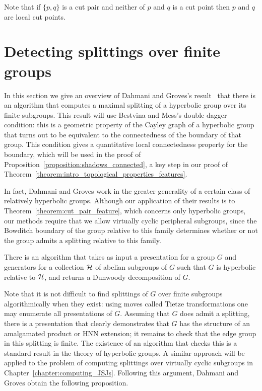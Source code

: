 \begin{remark}
  Note that if $\{p, q\}$ is a cut pair and neither of $p$ and $q$ is a cut point then $p$ and $q$ are local cut points.
\end{remark}

\section{Detecting splittings over finite groups}

In this section we give an overview of Dahmani and Groves's result~\cite{dahmanigroves08a} that there is an algorithm that computes a maximal splitting of a hyperbolic group over its finite subgroups. 
This result will use Bestvina and Mess's double dagger condition: this is a geometric property of the Cayley graph of a hyperbolic group that turns out to be equivalent to the connectedness of the boundary of that group.
This condition gives a quantitative local connectedness property for the boundary, which will be used in the proof of Proposition~\ref{proposition:shadows_connected}, a key step in our proof of Theorem~\ref{theorem:intro_topological_properties_features}.

In fact, Dahmani and Groves work in the greater generality of a certain class of relatively hyperbolic groups.
Although our application of their results is to Theorem~\ref{theorem:cut_pair_feature}, which concerns only hyperbolic groups, our methods require that we allow virtually cyclic peripheral subgroups, since the Bowditch boundary of the group relative to this family determines whether or not the group admits a splitting relative to this family. 

\begin{theorem}\cite{dahmanigroves08a}
  \label{theorem:dunwoody_decomposition_computable}
  There is an algorithm that takes as input a presentation for a group $G$ and generators for a collection $\mathcal{H}$ of abelian subgroups of $G$ such that $G$ is hyperbolic relative to $\mathcal{H}$, and returns a Dunwoody decomposition of $G$.
\end{theorem}

Note that it is not difficult to find splittings of $G$ over finite subgroups algorithmically when they exist: using moves called Tietze transformations one may enumerate all presentations of $G$.
Assuming that $G$ does admit a splitting, there is a presentation that clearly demonstrates that $G$ has the structure of an amalgamated product or HNN extension; it remains to check that the edge group in this splitting is finite.
The existence of an algorithm that checks this is a standard result in the theory of hyperbolic groups.
A similar approach will be applied to the problem of computing splittings over virtually cyclic subgroups in Chapter~\ref{chapter:computing_JSJs}.
Following this argument, Dahmani and Groves obtain the following proposition.

